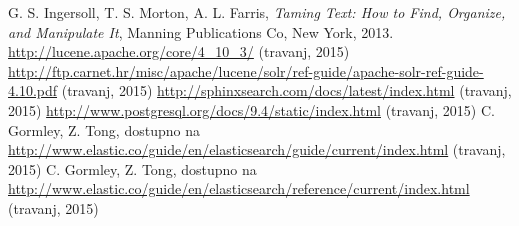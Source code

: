 \documentclass[a4paper,twoside,12pt]{scrreprt}
\begin{document}
\begin{thebibliography}{99}
   G. S. Ingersoll, T. S. Morton, A. L. Farris, \textit{Taming Text: How to Find, Organize, and Manipulate It}, Manning Publications Co, New York, 2013.
   \url{http://lucene.apache.org/core/4_10_3/} (travanj, 2015)
   \url{http://ftp.carnet.hr/misc/apache/lucene/solr/ref-guide/apache-solr-ref-guide-4.10.pdf} (travanj, 2015)
   \url{http://sphinxsearch.com/docs/latest/index.html} (travanj, 2015)
   \url{http://www.postgresql.org/docs/9.4/static/index.html} (travanj, 2015)
   C. Gormley, Z. Tong, dostupno na \url{http://www.elastic.co/guide/en/elasticsearch/guide/current/index.html} (travanj, 2015)
   C. Gormley, Z. Tong, dostupno na \url{http://www.elastic.co/guide/en/elasticsearch/reference/current/index.html} (travanj, 2015)
\end{thebibliography}

\pagestyle{empty}

\begin{sazetak}
\end{sazetak}

\begin{summary}
\end{summary}

\begin{cv}
\end{cv}
\end{document}
